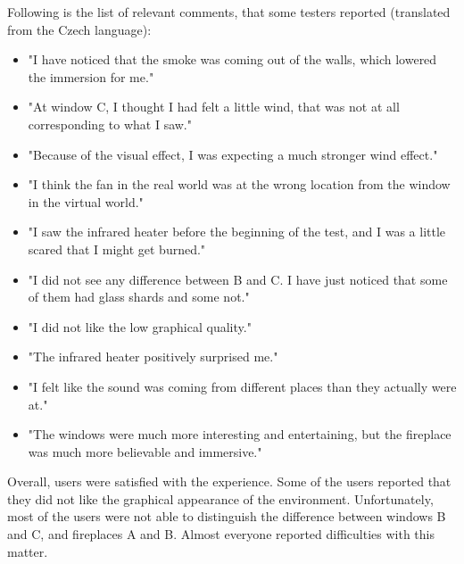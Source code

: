 Following is the list of relevant comments, that some testers reported
(translated from the Czech language):


\begin{itemize}

\item "I have noticed that the smoke was coming out of the walls, which
lowered the immersion for me."

\item "At window C, I thought I had felt a little wind,
that was not at all corresponding to what I saw."

\item "Because of the visual effect, I was expecting a much stronger wind
effect."

\item "I think the fan in the real world was at the wrong location from the
window in the virtual world."

\item "I saw the infrared heater before the beginning of the test, and I was
a little scared that I might get burned."

\item "I did not see any difference between B and C. I have just noticed that
some of them had glass shards and some not."

\item "I did not like the low graphical quality."

\item "The infrared heater positively surprised me."

\item "I felt like the sound was coming from different places than they actually
were at."

\item "The windows were much more interesting and entertaining, but the fireplace
was much more believable and immersive."

\end{itemize}


Overall, users were satisfied with the experience. Some of the users reported
that they did not like the graphical appearance of the environment.
Unfortunately, most of the users were not able to distinguish the difference
between windows B and C, and fireplaces A and B. Almost everyone reported
difficulties with this matter.